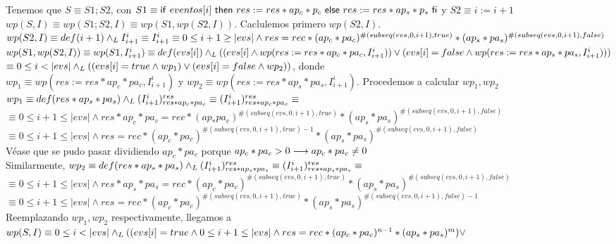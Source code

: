 \documentclass[10pt,a4paper]{article}
\begin{document}
\begin{proof*}
    Tenemos que $S \equiv S1; S2$, con $S1 \equiv \mathsf{if}\ eventos[i]\ \mathsf{then}\ res:=res * ap_c * p_c\ \mathsf{else}\ res:=res*ap_s*p_s\ \mathsf{fi}$ y $S2 \equiv i:= i+1$\\
	$wp(S, I) \equiv wp(S1; S2, I) \equiv wp(S1, wp(S2, I))$.
	Caclulemos primero $wp(S2, I)$. \\ 
	$wp(S2, I) \equiv def(i+1) \land _L I_{i+1}^i \equiv I_{i+1}^i \equiv\\
	0 \leq i+1 \geq |evs| \wedge res = rec *  (ap_c * pa_c)^{\#(subseq(evs, 0, i+1), true)} * (ap_s * pa_s)^{\#(subseq(evs, 0, i+1), false)}$\\
	$wp(S1, wp(S2, I)) \equiv wp(S1, I_{i+1}^i) \equiv def(evs[i]) \land _L ((evs[i] \wedge wp(res:=res * ap_c * pa_c, I_{i+1}^i)) \vee (evs[i] = false \wedge wp(res:=res * ap_s * pa_s, I_{i+1}^i)) ) $\\
	$\equiv 0 \leq i < |evs| \land _L ((evs[i] = true \wedge wp_1) \vee (evs[i] = false \wedge wp_2))$, donde \\
	$wp_1 \equiv wp(res:= res* ap_c * pa_c, I_{i+1}^i)$ y $wp_2 \equiv wp(res:= res*ap_s *pa_s, I_{i+1}^i)$. 
	Procedemos a calcular $wp_1, wp_2$\\
	$wp_1 \equiv def (res*ap_s*pa_s) \land _L (I_{i+1}^i)_{res*ap_c*pa_c}^{res} \equiv (I_{i+1}^i)_{res*ap_c*pa_c}^{res} \equiv$
	$\equiv 0\leq i+1 \leq |evs| \wedge res * ap_c * pa_c = rec *(ap_ * pa_c)^{\#(subseq(evs, 0, i+1), true)} * (ap_s * pa_s)^{\#(subseq(evs, 0, i+1), false)}$\\
	$\equiv 0\leq i+1 \leq |evs| \wedge res = rec *(ap_c * pa_c)^{\#(subseq(evs, 0, i+1), true) - 1} * (ap_s * pa_s)^{\#(subseq(evs, 0, i+1), false)}$\\
	Véase que se pudo pasar dividiendo $ap_c * pa_c$ porque $ap_c * pa_c > 0 \longrightarrow ap_c * pa_c \not= 0$ \\
	Similarmente,
	$wp_2 \equiv def (res*ap_s*pa_s) \land _L (I_{i+1}^i)_{res*ap_s*pa_s}^{res} \equiv (I_{i+1}^i)_{res*ap_s*pa_s}^{res} \equiv$
	$\equiv 0\leq i+1 \leq |evs| \wedge res * ap_s * pa_s = rec *(ap_c * pa_c)^{\#(subseq(evs, 0, i+1), true)} * (ap_s * pa_s)^{\#(subseq(evs, 0, i+1), false)}$\\
	$\equiv 0\leq i+1 \leq |evs| \wedge res = rec *(ap_c * pa_c)^{\#(subseq(evs, 0, i+1), true)} * (ap_s * pa_s)^{\#(subseq(evs, 0, i+1), false) - 1}$\\
	Reemplazando $wp_1, wp_2$ respectivamente, llegamos a \\
	$wp(S, I) \equiv 0 \leq i < |evs| \land _L ((evs[i] = true \wedge 0\leq i+1 \leq |evs| \wedge res = rec *(ap_c * pa_c)^{n - 1} * (ap_s * pa_s)^m) \vee $\\

\end{proof*}
\end{document}
